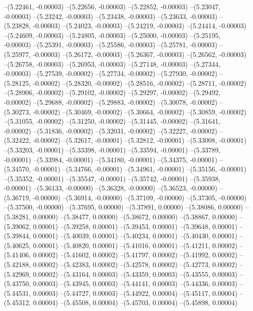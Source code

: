 --(5.22461, -0.00003)
--(5.22656, -0.00003)
--(5.22852, -0.00003)
--(5.23047, -0.00003)
--(5.23242, -0.00003)
--(5.23438, -0.00003)
--(5.23633, -0.00003)
--(5.23828, -0.00003)
--(5.24023, -0.00003)
--(5.24219, -0.00003)
--(5.24414, -0.00003)
--(5.24609, -0.00003)
--(5.24805, -0.00003)
--(5.25000, -0.00003)
--(5.25195, -0.00003)
--(5.25391, -0.00003)
--(5.25586, -0.00003)
--(5.25781, -0.00003)
--(5.25977, -0.00003)
--(5.26172, -0.00003)
--(5.26367, -0.00003)
--(5.26562, -0.00003)
--(5.26758, -0.00003)
--(5.26953, -0.00003)
--(5.27148, -0.00003)
--(5.27344, -0.00003)
--(5.27539, -0.00002)
--(5.27734, -0.00002)
--(5.27930, -0.00002)
--(5.28125, -0.00002)
--(5.28320, -0.00002)
--(5.28516, -0.00002)
--(5.28711, -0.00002)
--(5.28906, -0.00002)
--(5.29102, -0.00002)
--(5.29297, -0.00002)
--(5.29492, -0.00002)
--(5.29688, -0.00002)
--(5.29883, -0.00002)
--(5.30078, -0.00002)
--(5.30273, -0.00002)
--(5.30469, -0.00002)
--(5.30664, -0.00002)
--(5.30859, -0.00002)
--(5.31055, -0.00002)
--(5.31250, -0.00002)
--(5.31445, -0.00002)
--(5.31641, -0.00002)
--(5.31836, -0.00002)
--(5.32031, -0.00002)
--(5.32227, -0.00002)
--(5.32422, -0.00002)
--(5.32617, -0.00001)
--(5.32812, -0.00001)
--(5.33008, -0.00001)
--(5.33203, -0.00001)
--(5.33398, -0.00001)
--(5.33594, -0.00001)
--(5.33789, -0.00001)
--(5.33984, -0.00001)
--(5.34180, -0.00001)
--(5.34375, -0.00001)
--(5.34570, -0.00001)
--(5.34766, -0.00001)
--(5.34961, -0.00001)
--(5.35156, -0.00001)
--(5.35352, -0.00001)
--(5.35547, -0.00001)
--(5.35742, -0.00001)
--(5.35938, -0.00001)
--(5.36133, -0.00000)
--(5.36328, -0.00000)
--(5.36523, -0.00000)
--(5.36719, -0.00000)
--(5.36914, -0.00000)
--(5.37109, -0.00000)
--(5.37305, -0.00000)
--(5.37500, -0.00000)
--(5.37695, 0.00000)
--(5.37891, 0.00000)
--(5.38086, 0.00000)
--(5.38281, 0.00000)
--(5.38477, 0.00000)
--(5.38672, 0.00000)
--(5.38867, 0.00000)
--(5.39062, 0.00001)
--(5.39258, 0.00001)
--(5.39453, 0.00001)
--(5.39648, 0.00001)
--(5.39844, 0.00001)
--(5.40039, 0.00001)
--(5.40234, 0.00001)
--(5.40430, 0.00001)
--(5.40625, 0.00001)
--(5.40820, 0.00001)
--(5.41016, 0.00001)
--(5.41211, 0.00002)
--(5.41406, 0.00002)
--(5.41602, 0.00002)
--(5.41797, 0.00002)
--(5.41992, 0.00002)
--(5.42188, 0.00002)
--(5.42383, 0.00002)
--(5.42578, 0.00002)
--(5.42773, 0.00002)
--(5.42969, 0.00002)
--(5.43164, 0.00003)
--(5.43359, 0.00003)
--(5.43555, 0.00003)
--(5.43750, 0.00003)
--(5.43945, 0.00003)
--(5.44141, 0.00003)
--(5.44336, 0.00003)
--(5.44531, 0.00003)
--(5.44727, 0.00003)
--(5.44922, 0.00004)
--(5.45117, 0.00004)
--(5.45312, 0.00004)
--(5.45508, 0.00004)
--(5.45703, 0.00004)
--(5.45898, 0.00004)
